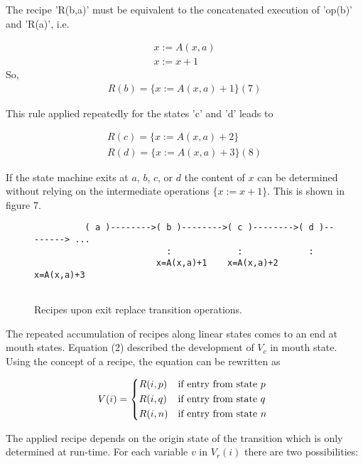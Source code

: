 \documentclass[12pt,a4paper]{scrartcl}
\theoremstyle{break}
\begin{document}
The recipe 'R(b,a)' must be equivalent to the concatenated execution of 'op(b)'
and 'R(a)', i.e.

\begin{eqnarray}
    { x  :=  A(x,a) } \\
    { x  :=  x + 1 }
\end{eqnarray}
So, 
\begin{eqnarray}
    R(b)  =  \{ x := A(x,a) + 1 \}                                 (7)
\end{eqnarray}

This rule applied repeatedly for the states 'c' and 'd' leads to

\begin{eqnarray}
    R(c)  =  \{ x := A(x,a) + 2 \} \\
    R(d)  =  \{ x := A(x,a) + 3 \}                                 (8)
\end{eqnarray}

If the state machine exits at $a$, $b$, $c$, or $d$ the content of $x$ can be
determined without relying on the intermediate operations $\{ x:=x+1 \}$. This
is shown in figure 7.
 
\begin{figure}[htbp] \leavevmode
\begin{verbatim}
          ( a )-------->( b )-------->( c )-------->( d )--------> ...
                          :             :             :
                        x=A(x,a)+1    x=A(x,a)+2    x=A(x,a)+3


\end{verbatim}
\caption{Recipes upon exit replace transition operations.}
\end{figure}

The repeated accumulation of recipes along linear states comes to an end at
mouth states.  Equation (2) described the development of $V_c$ in mouth
state. Using the concept of a recipe, the equation can be rewritten as

\begin{eqnarray}
    V(i)  =  \begin{dcases*}
               R(i,p) &  if entry from state $p$ \\
               R(i,q) &  if entry from state $q$ \\
               R(i,n) &  if entry from state $n$
            \end{dcases*}
\end{eqnarray}

The applied recipe depends on the origin state of the transition which is only
determined at run-time.  For each variable $v$ in $V_r(i)$ there are two
possibilities:
\end{document}
